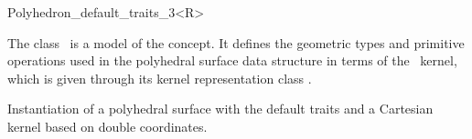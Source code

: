 
\ccRefPageBegin



\begin{ccRefClass}{Polyhedron_default_traits_3<R>}

\ccDefinition
  
The class \ccRefName\ is a model of the 
concept.  It defines the geometric types and primitive operations
used in the polyhedral surface data structure
 in terms of the \cgal\ kernel, which is 
given through its kernel representation class .


\ccIsModel


\ccTypes
{}

\ccGlue
{}
\ccGlue
{}

\ccCreation
{}  %


\ccExample

Instantiation of a polyhedral surface with the default traits and a 
Cartesian kernel based on double coordinates. 


\end{ccRefClass}

\ccRefPageEnd

